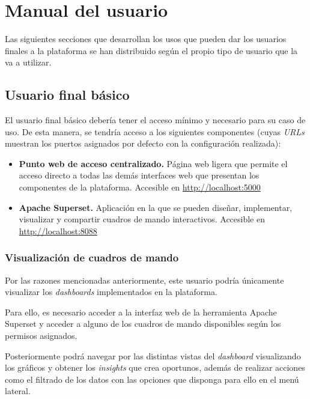 \section{Manual del usuario}

Las siguientes secciones que desarrollan los usos que pueden dar los usuarios finales a la plataforma se han distribuido según el propio tipo de usuario que la va a utilizar. 

\subsection{Usuario final básico}

El usuario final básico debería tener el acceso mínimo y necesario para su caso de uso. De esta manera, se tendría acceso a los siguientes componentes (cuyas \textit{URLs} muestran los puertos asignados por defecto con la configuración realizada):

\begin{itemize}
    \item \textbf{Punto web de acceso centralizado.} Página web ligera que permite el acceso directo a todas las demás interfaces web que presentan los componentes de la plataforma. Accesible en \url{http://localhost:5000}

    \item \textbf{Apache Superset.} Aplicación en la que se pueden diseñar, implementar, visualizar y compartir cuadros de mando interactivos. Accesible en \url{http://localhost:8088}

\end{itemize}

\subsubsection{Visualización de cuadros de mando}

Por las razones mencionadas anteriormente, este usuario podría únicamente visualizar los \textit{dashboards} implementados en la plataforma.

Para ello, es necesario acceder a la interfaz web de la herramienta Apache Superset y acceder a alguno de los cuadros de mando disponibles según los permisos asignados.

Posteriormente podrá navegar por las distintas vistas del \textit{dashboard} visualizando los gráficos y obtener los \textit{insights} que crea oportunos, además de realizar acciones como el filtrado de los datos con las opciones que disponga para ello en el menú lateral.


